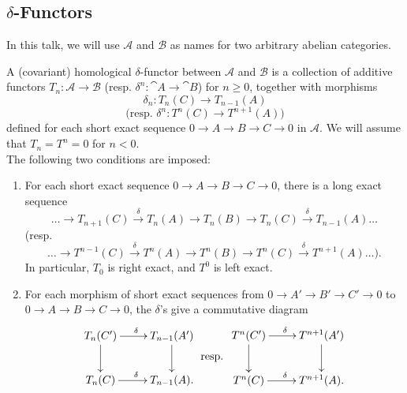 \subsection{$\delta$-Functors}

\begin{notation}
	In this talk, we will use $\mathcal{A}$ and $\mathcal{B}$ as names for two arbitrary abelian categories.
\end{notation}

\begin{definition}
	A (covariant) homological $\delta$-functor between $\mathcal{A}$ and $\mathcal{B}$ is a collection of additive functors $T_n:\mathcal{A}\rightarrow\mathcal{B}$ (resp. $\delta^n:\cat{A}\rightarrow\cat{B}$) for $n\geq0$, together with morphisms
	$$\delta_n:T_n(C)\rightarrow T_{n-1}(A)$$
	$$\text{(resp. } \delta^n:T^n(C)\rightarrow T^{n+1}(A)\text{)}$$
	defined for each short exact sequence $0\rightarrow A \rightarrow B \rightarrow C \rightarrow 0$ in $\mathcal{A}$.
	We will assume that $T_n = T^n = 0$ for $n<0$. \\
	The following two conditions are imposed:
	\begin{enumerate}[label=\arabic*.]
		\item For each short exact sequence $0 \rightarrow A \rightarrow B \rightarrow C \rightarrow 0$, there is a long exact sequence
		$$\dots \rightarrow T_{n+1}(C) \overset{\delta}{\longrightarrow} T_n(A) \rightarrow T_n(B) \rightarrow T_n(C) \overset{\delta}{\longrightarrow} T_{n-1}(A) \dots$$
		(resp.
		$$\dots \rightarrow T^{n-1}(C) \overset{\delta}{\longrightarrow} T^n(A) \rightarrow T^n(B) \rightarrow T^n(C) \overset{\delta}{\longrightarrow} T^{n+1}(A) \dots\text{).}$$
		In particular, $T_0$ is right exact, and $T^0$ is left exact.
		
		\item For each morphism of short exact sequences from $0 \rightarrow A' \rightarrow B' \rightarrow C' \rightarrow 0$ to $0 \rightarrow A \rightarrow B \rightarrow C \rightarrow 0$, the $\delta$'s give a commutative diagram
		\[
			\vcenter{\xymatrix{
				T_n(C') \ar[r]^{\delta} \ar[d] & T_{n-1}(A') \ar[d] \\
				T_n(C) \ar[r]^{\delta} & T_{n-1}(A).
			}}
			\text{ resp. }
			\vcenter{\xymatrix{
				T^n(C') \ar[r]^{\delta} \ar[d] & T^{n+1}(A') \ar[d] \\
				T^n(C) \ar[r]^{\delta} & T^{n+1}(A).
			}}
		\]
	\end{enumerate}
\end{definition}

